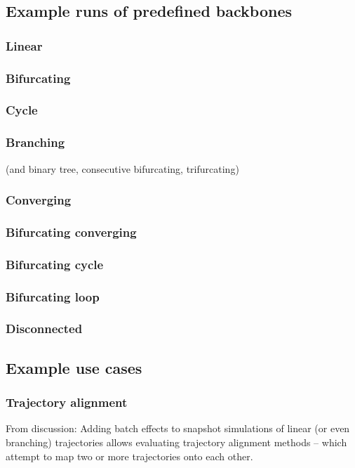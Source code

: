 \subsection{Example runs of predefined backbones}

\subsubsection{Linear}
\subsubsection{Bifurcating}
\subsubsection{Cycle}
\subsubsection{Branching} (and binary tree, consecutive bifurcating, trifurcating)
\subsubsection{Converging}
\subsubsection{Bifurcating converging}
\subsubsection{Bifurcating cycle}
\subsubsection{Bifurcating loop}
\subsubsection{Disconnected}

\subsection{Example use cases}
\subsubsection{Trajectory alignment}
From discussion: Adding batch effects to snapshot simulations of linear (or even branching) trajectories allows evaluating trajectory alignment methods -- which attempt to map two or more trajectories onto each other. 
